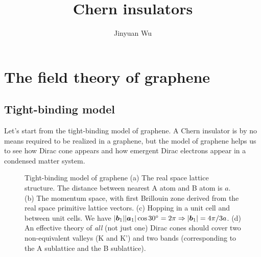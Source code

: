 \documentclass[hyperref, a4paper]{article}
\title{Chern insulators}
\author{Jinyuan Wu}
\begin{document}
\maketitle

\section{The field theory of graphene}

\subsection{Tight-binding model}

Let's start from the tight-binding model of graphene.
A Chern insulator is by no means required to be realized in a graphene,
but the model of graphene helps us to see how Dirac cone appears 
and how emergent Dirac electrons appear in a condensed matter system.

\begin{figure}
    \centering
    
    \caption{Tight-binding model of graphene (a) The real space lattice structure. 
    The distance between nearest A atom and B atom is $a$.
    (b) The momentum space, with first Brillouin zone derived from the real space primitive lattice vectors.
    (c) Hopping in a unit cell and between unit cells.
    We have $\abs{\vb*{b}_1} \abs{\vb*{a}_1} \cos \SI{30}{\degree} = 2\pi \Rightarrow \abs{\vb*{b}_1} = 4\pi / 3a$.
    (d) An effective theory of \emph{all} (not just one) Dirac cones 
    should cover two non-equivalent valleys (K and K') and two bands 
    (corresponding to the A sublattice and the B sublattice).}
    \label{fig:graphene}
\end{figure}
\end{document}
